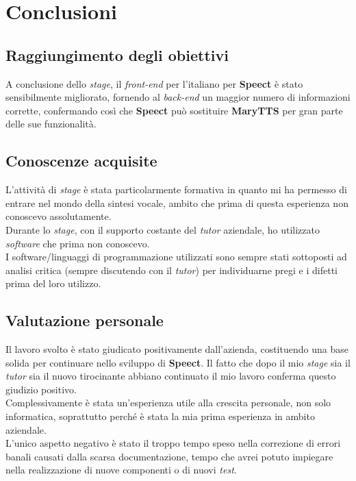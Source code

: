 
\chapter{Conclusioni}
\label{cap:conclusioni}


\section{Raggiungimento degli obiettivi}
A conclusione dello \textit{stage}, il \textit{front-end} per l'italiano per \textbf{Speect}
è stato sensibilmente migliorato, fornendo al \textit{back-end} un maggior numero di informazioni corrette,
confermando così che \textbf{Speect} può sostituire \textbf{MaryTTS}
per gran parte delle sue funzionalità.
\section{Conoscenze acquisite}
L'attività di \textit{stage} è stata particolarmente formativa in quanto
mi ha permesso di entrare nel mondo della sintesi vocale, ambito
che prima di questa esperienza non conoscevo assolutamente. \\
Durante lo \textit{stage}, con il supporto costante del \textit{tutor} aziendale, ho utilizzato
\textit{software} che prima non conoscevo. \\ I software/linguaggi di programmazione utilizzati
sono sempre stati sottoposti ad analisi critica (sempre discutendo con il \textit{tutor}) 
per individuarne pregi e i difetti prima del loro utilizzo.
 
\section{Valutazione personale}
Il lavoro svolto è stato giudicato positivamente dall'azienda, costituendo una base solida 
per continuare nello sviluppo di \textbf{Speect}. Il fatto che dopo il mio \textit{stage} sia il
\textit{tutor} sia il nuovo tirocinante abbiano continuato il mio lavoro conferma questo giudizio positivo. \\
Complessivamente è stata un'esperienza utile alla crescita personale, non solo informatica, soprattutto
perché è stata la mia prima esperienza in ambito aziendale. \\
L'unico aspetto negativo è stato il troppo tempo speso nella correzione di errori banali
causati dalla scarsa documentazione, tempo che avrei potuto impiegare nella realizzazione 
di nuove componenti o di nuovi \textit{test}.

